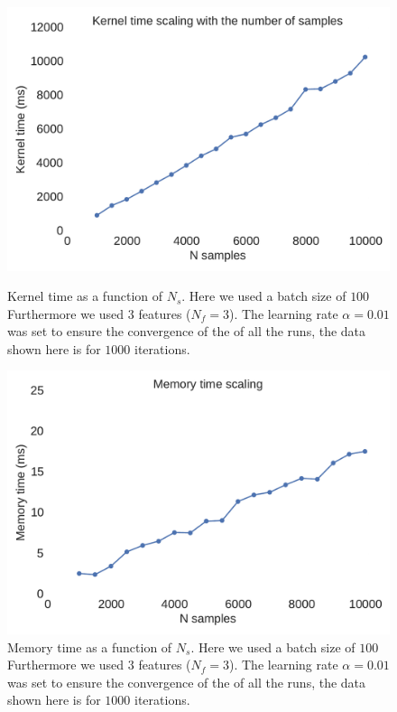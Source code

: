 \documentclass[11pt,a4paper]{article}
\begin{document}
\begin{figure}[H]
	\centering
  \includegraphics[width=\linewidth]{kernel_time_n_samples.pdf}
  \caption{Kernel time as a function of $N_s$. Here we used a batch size of $100$ Furthermore we used $3$ features ($N_f=3$). The learning rate $\alpha=0.01$ was set to ensure the convergence of the of all the runs, the data shown here is for $1000$ iterations.}
  \label{fig:n_samples_kernel}
\endminipage
\hfill
{}
  \includegraphics[width=\linewidth]{memory_time_n_samples.pdf}
  \caption{Memory time as a function of $N_s$. Here we used a batch size of $100$ Furthermore we used $3$ features ($N_f=3$). The learning rate $\alpha=0.01$ was set to ensure the convergence of the of all the runs, the data shown here is for $1000$ iterations.}
  \label{fig:n_samples_memory}
\endminipage
\end{figure}
\end{document}
